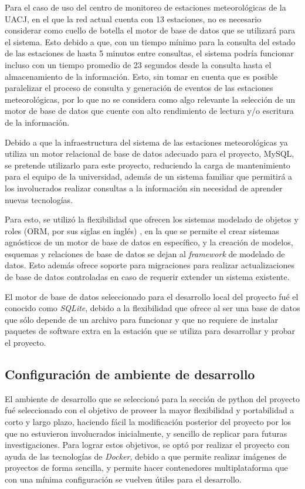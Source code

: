 Para el caso de uso del centro de monitoreo de estaciones meteorológicas de la UACJ, en el que la red actual cuenta con 13 estaciones, no es necesario considerar como cuello de botella el motor de base de datos que se utilizará para el sistema. Esto debido a que, con un tiempo mínimo para la consulta del estado de las estaciones de hasta 5 minutos entre consultas, el sistema podría funcionar incluso con un tiempo promedio de 23 segundos desde la consulta hasta el almacenamiento de la información. Esto, sin tomar en cuenta que es posible paralelizar el proceso de consulta y generación de eventos de las estaciones meteorológicas, por lo que no se considera como algo relevante la selección de un motor de base de datos que cuente con alto rendimiento de lectura y/o escritura de la información.

Debido a que la infraestructura del sistema de las estaciones meteorológicas ya utiliza un motor relacional de base de datos adecuado para el proyecto, MySQL, se pretende utilizarlo para este proyecto, reduciendo la carga de mantenimiento para el equipo de la universidad, además de un sistema familiar que permitirá a los involucrados realizar consultas a la información sin necesidad de aprender nuevas tecnologías.

Para esto, se utilizó la flexibilidad que ofrecen los sistemas modelado de objetos y roles (ORM, por sus siglas en inglés) \cite{Halpin2006}, en la que se permite el crear sistemas agnósticos de un motor de base de datos en específico, y la creación de modelos, esquemas y relaciones de base de datos se dejan al \textit{framework} de modelado de datos. Esto además ofrece soporte para migraciones para realizar actualizaciones de base de datos controladas en caso de requerir extender un sistema existente.

El motor de base de datos seleccionado para el desarrollo local del proyecto fué el conocido como \textit{SQLite}, debido a la flexibilidad que ofrece al ser una base de datos que sólo depende de un archivo para funcionar y que no requiere de instalar paquetes de software extra en la estación que se utiliza para desarrollar y probar el proyecto.

\subsection{Configuración de ambiente de
desarrollo}\label{configuraciuxf3n-de-ambiente-de-desarrollo}

El ambiente de desarrollo que se seleccionó para la sección de python del proyecto fué seleccionado con el objetivo de proveer la mayor flexibilidad y portabilidad a corto y largo plazo, haciendo fácil la modificación posterior del proyecto por los que no estuvieron involucrados inicialmente, y sencillo de replicar para futuras investigaciones. Para lograr estos objetivos, se optó por realizar el proyecto con ayuda de las tecnologías de \textit{Docker}, debido a que permite realizar imágenes de proyectos de forma sencilla, y permite hacer contenedores multiplataforma que con una mínima configuración se vuelven útiles para el desarrollo.

